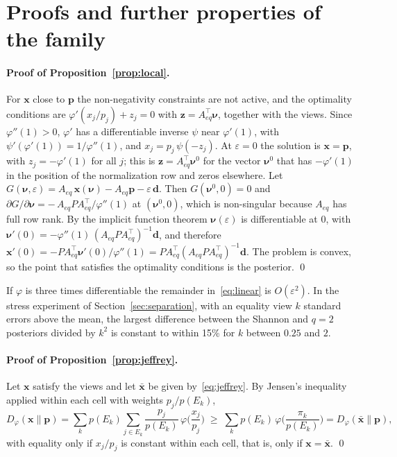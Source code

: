 \documentclass[11pt]{article}
\newcommand{\p}{\mathbf{p}}
\newcommand{\x}{\mathbf{x}}
\begin{document}
\section{Proofs and further properties of the family}\label{app:proofs}

\paragraph{Proof of Proposition~\ref{prop:local}.} For $\x$ close to $\p$
the non-negativity constraints are not active, and the optimality
conditions are $\varphi'(x_j/p_j) + z_j = 0$ with
$\mathbf{z} = A_{eq}^\top \boldsymbol{\nu}$, together with the views. Since
$\varphi''(1) > 0$, $\varphi'$ has a differentiable inverse $\psi$ near
$\varphi'(1)$, with $\psi'(\varphi'(1)) = 1/\varphi''(1)$, and
$x_j = p_j\,\psi(-z_j)$. At $\varepsilon = 0$ the solution is $\x = \p$,
with $z_j = -\varphi'(1)$ for all $j$; this is
$\mathbf{z} = A_{eq}^\top \boldsymbol{\nu}^0$ for the vector
$\boldsymbol{\nu}^0$ that has $-\varphi'(1)$ in the position of the
normalization row and zeros elsewhere. Let
$G(\boldsymbol{\nu}, \varepsilon) = A_{eq}\,\x(\boldsymbol{\nu}) -
A_{eq}\p - \varepsilon\,\mathbf{d}$. Then $G(\boldsymbol{\nu}^0, 0) = 0$
and
$\partial G/\partial \boldsymbol{\nu} = -\,A_{eq} P A_{eq}^\top /
\varphi''(1)$ at $(\boldsymbol{\nu}^0, 0)$, which is non-singular because
$A_{eq}$ has full row rank. By the implicit function theorem
$\boldsymbol{\nu}(\varepsilon)$ is differentiable at $0$, with
$\boldsymbol{\nu}'(0) = -\varphi''(1)\,(A_{eq} P A_{eq}^\top)^{-1}
\mathbf{d}$, and therefore
$\x'(0) = -P A_{eq}^\top \boldsymbol{\nu}'(0)/\varphi''(1)
= P A_{eq}^\top (A_{eq} P A_{eq}^\top)^{-1}\mathbf{d}$. The problem is
convex, so the point that satisfies the optimality conditions is the
posterior. \qed

If $\varphi$ is three times differentiable the remainder
in~\eqref{eq:linear} is $O(\varepsilon^2)$. In the stress experiment of
Section~\ref{sec:separation}, with an equality view $k$ standard errors
above the mean, the largest difference between the Shannon and $q=2$
posteriors divided by $k^2$ is constant to within 15\% for $k$ between
$0.25$ and $2$.

\paragraph{Proof of Proposition~\ref{prop:jeffrey}.} Let $\x$ satisfy the
views and let $\bar{\x}$ be given by~\eqref{eq:jeffrey}. By Jensen's
inequality applied within each cell with weights $p_j/p(E_k)$,
\[
D_\varphi(\x\|\p) = \sum_k p(E_k) \sum_{j \in E_k} \frac{p_j}{p(E_k)}\,
\varphi\!\Big(\frac{x_j}{p_j}\Big)
\;\ge\; \sum_k p(E_k)\, \varphi\!\Big(\frac{\pi_k}{p(E_k)}\Big)
= D_\varphi(\bar{\x}\|\p),
\]
with equality only if $x_j/p_j$ is constant within each cell, that is, only
if $\x = \bar{\x}$. \qed
\end{document}
